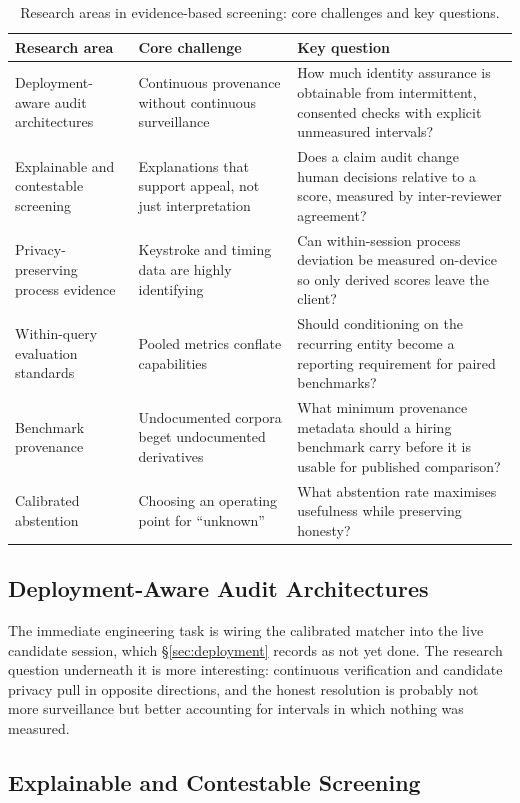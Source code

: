 \begin{table}[t]
\caption{Research areas in evidence-based screening: core challenges and key
questions.}
\label{tab:research-areas}
\small
\begin{tabular}{@{}p{3.0cm}p{5.6cm}p{6.4cm}@{}}
\toprule
Research area & Core challenge & Key question \\
\midrule
Deployment-aware audit architectures & Continuous provenance without continuous
surveillance & How much identity assurance is obtainable from intermittent,
consented checks with explicit unmeasured intervals? \\
Explainable and contestable screening & Explanations that support appeal, not
just interpretation & Does a claim audit change human decisions relative to a
score, measured by inter-reviewer agreement? \\
Privacy-preserving process evidence & Keystroke and timing data are highly
identifying & Can within-session process deviation be measured on-device so only
derived scores leave the client? \\
Within-query evaluation standards & Pooled metrics conflate capabilities & Should
conditioning on the recurring entity become a reporting requirement for paired
benchmarks? \\
Benchmark provenance & Undocumented corpora beget undocumented derivatives &
What minimum provenance metadata should a hiring benchmark carry before it is
usable for published comparison? \\
Calibrated abstention & Choosing an operating point for ``unknown'' & What
abstention rate maximises usefulness while preserving honesty? \\
\bottomrule
\end{tabular}
\end{table}

\subsection{Deployment-Aware Audit Architectures}

The immediate engineering task is wiring the calibrated matcher into the live
candidate session, which \S\ref{sec:deployment} records as not yet done. The
research question underneath it is more interesting: continuous verification and
candidate privacy pull in opposite directions, and the honest resolution is
probably not more surveillance but better accounting for intervals in which
nothing was measured.

\subsection{Explainable and Contestable Screening}

